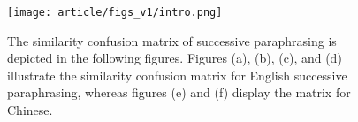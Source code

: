 \begin{figure}
    \centering
    \texttt{[image: article/figs\_v1/intro.png]}
    \caption{The similarity confusion matrix of successive paraphrasing is depicted in the following figures. Figures (a), (b), (c), and (d) illustrate the similarity confusion matrix for English successive paraphrasing, whereas figures (e) and (f) display the matrix for Chinese.}  
\end{figure}














